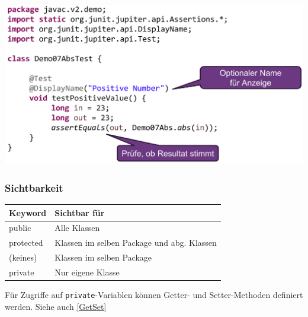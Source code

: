 \begin{center}
    \includegraphics[width=0.9\columnwidth]{pictures/testmethode.png}    
\end{center}

\subsubsection{Sichtbarkeit}
\begin{center}
    \begin{tabular}{ll}
        \rowcolor[RGB]{239,239,239} 
        \textbf{Keyword} & \textbf{Sichtbar für} \\ \hline
        public & Alle Klassen \\
        protected & Klassen im selben Package und abg. Klassen\\
        (keines) & Klassen im selben Package \\
        private & Nur eigene Klasse \\
    \end{tabular}
\end{center}

Für Zugriffe auf \verb|private|-Variablen können Getter- und Setter-Methoden definiert werden. Siehe auch \ref{GetSet}


